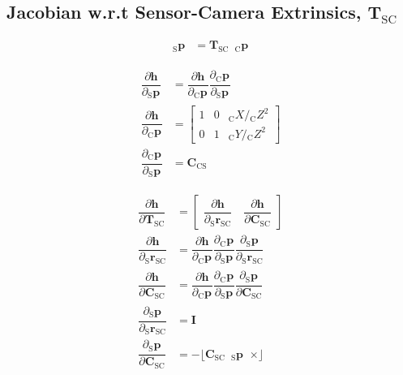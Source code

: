\documentclass{article}
\renewcommand{\Vec}[1]{{\mathbf{#1}}}
\newcommand{\Mat}[1]{{\mathbf{#1}}}
\newcommand{\I}{{\Mat{I}}}
\newcommand{\Skew}[1]{{\lfloor #1 \enspace \times \rfloor}}
\newcommand{\tf}{\mathbf{T}}
\newcommand{\cam}{{\text{C}}}
\newcommand{\sensor}{{\text{S}}}
\newcommand{\fiducial}{{\text{F}}}
\newcommand{\KineNotationTransform}[3]{{{#1}_{#2#3}}}
\newcommand{\KineNotation}[3]{{{{}_{#2}} {#1}_{#2#3}}}
\newcommand{\KineNotationPart}[3]{{{{}_{#2}} {#1}_{#3}}}
\newcommand{\KineNotationBare}[2]{{{{}_{#2}} {#1}}}
\newcommand{\pos}{{\Vec{r}}}
\newcommand{\Pos}[2]{{\KineNotation{\pos}{#1}{#2}}}
\newcommand{\rot}{{\Mat{C}}}
\newcommand{\Rot}[2]{{\KineNotationTransform{\rot}{#1}{#2}}}
\newcommand{\tf}{{\Mat{T}}}
\newcommand{\Tf}[2]{{\KineNotationTransform{\tf}{#1}{#2}}}
\newcommand{\point}{\Vec{p}}
\newcommand{\Pt}[1]{{\KineNotationPart{\point}{#1}{}}}
\newcommand{\Point}[2]{{\KineNotationBare{\point}{#1}}}
\newcommand{\projFunc}{{\Vec{h}}}
\begin{document}
\subsection{Jacobian w.r.t Sensor-Camera Extrinsics, $\Tf{\sensor}{\cam}$}

\begin{align}
  \Point{\sensor}{\fiducial_{ij}}
  &=
    \Tf{\sensor}{\cam}
    \enspace \Pt{\cam}
\end{align}

\begin{align}
  \dfrac{\partial{\projFunc}}{\partial{\Pt{\sensor}}}
  &=
  \dfrac{\partial{\projFunc}}{\partial{\Pt{\cam}}}
  \dfrac{\partial{\Pt{\cam}}}{\partial{\Pt{\sensor}}} \\
  \dfrac{\partial{\projFunc}}{\partial{\Pt{\cam}}}
  &=
  \begin{bmatrix}
    1 & 0 & \KineNotationBare{X}{\cam} / \KineNotationBare{Z}{\cam}^{2} \\
    0 & 1 & \KineNotationBare{Y}{\cam} / \KineNotationBare{Z}{\cam}^{2}
  \end{bmatrix} \\
  \dfrac{\partial{\Pt{\cam}}}{\partial{\Pt{\sensor}}}
  &=
  \Rot{\cam}{\sensor}
\end{align}


\begin{align}
  \dfrac{\partial{\projFunc}}{\partial{\Tf{\sensor}{\cam}}}
    &=
  \begin{bmatrix}
    \dfrac{\partial{\projFunc}}{\partial{\Pos{\sensor}{\cam}}}
    \quad
    \dfrac{\partial{\projFunc}}{\partial{\Rot{\sensor}{\cam}}}
  \end{bmatrix} \\
  \dfrac{\partial{\projFunc}}{\partial{\Pos{\sensor}{\cam}}}
    &=
      \dfrac{\partial{\projFunc}}{\partial{\Pt{\cam}}}
      \dfrac{\partial{\Pt{\cam}}}{\partial{\Pt{\sensor}}}
      \dfrac{\partial{\Pt{\sensor}}}{\partial{\Pos{\sensor}{\cam}}} \\
  \dfrac{\partial{\projFunc}}{\partial{\Rot{\sensor}{\cam}}}
    &=
      \dfrac{\partial{\projFunc}}{\partial{\Pt{\cam}}}
      \dfrac{\partial{\Pt{\cam}}}{\partial{\Pt{\sensor}}}
      \dfrac{\partial{\Pt{\sensor}}}{\partial{\Rot{\sensor}{\cam}}} \\
    \dfrac{\partial{\Pt{\sensor}}}{\partial{\Pos{\sensor}{\cam}}}
    &=
      \I \\
    \dfrac{\partial{\Pt{\sensor}}}{\partial{\Rot{\sensor}{\cam}}}
    &= -\Skew{\Rot{\sensor}{\cam} \enspace \Pt{\sensor}}
\end{align}
\end{document}
